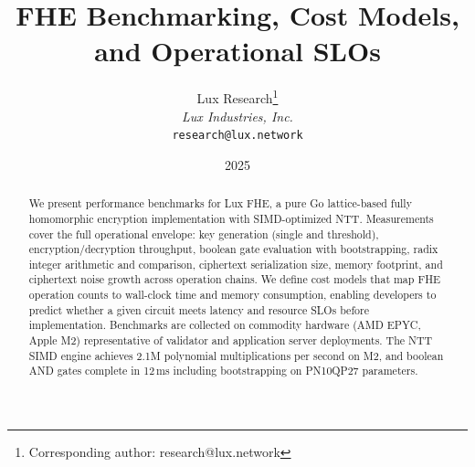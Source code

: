 \documentclass[11pt]{article}
\title{FHE Benchmarking, Cost Models, and Operational SLOs}
\author{
Lux Research\thanks{Corresponding author: research@lux.network}\\
\textit{Lux Industries, Inc.}\\
\texttt{research@lux.network}
}
\date{2025}
\begin{document}
\luxcoverpage

\begin{abstract}
We present performance benchmarks for Lux FHE, a pure Go lattice-based fully homomorphic encryption implementation with SIMD-optimized NTT. Measurements cover the full operational envelope: key generation (single and threshold), encryption/decryption throughput, boolean gate evaluation with bootstrapping, radix integer arithmetic and comparison, ciphertext serialization size, memory footprint, and ciphertext noise growth across operation chains. We define cost models that map FHE operation counts to wall-clock time and memory consumption, enabling developers to predict whether a given circuit meets latency and resource SLOs before implementation. Benchmarks are collected on commodity hardware (AMD EPYC, Apple M2) representative of validator and application server deployments. The NTT SIMD engine achieves 2.1M polynomial multiplications per second on M2, and boolean AND gates complete in 12\,ms including bootstrapping on PN10QP27 parameters.
\end{abstract}














\end{document}
